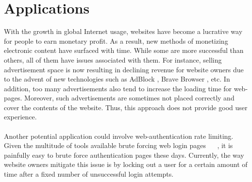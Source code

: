 \documentclass[runningheads]{llncs}
\begin{document}
\section{Applications}
With the growth in global Internet usage, websites have become a lucrative way for people to earn monetary profit. As a result, new methods of monetizing electronic content have surfaced with time. While some are more successful than others, all of them have issues associated with them. For instance, selling advertisement space is now resulting in declining revenue \cite{decliningRevenue} for website owners due to the advent of new technologies such as AdBlock \cite{Adblock}, Brave Browser \cite{BraveBrowser}, etc. In addition, too many advertisements also tend to increase the loading time for web-pages. Moreover, such advertisements are sometimes not placed correctly and cover the contents of the website. Thus, this approach does not provide good user experience. \\ \\
Another potential application could involve web-authentication rate limiting. Given the multitude of tools available brute forcing web login pages ~\cite{hydra} ~\cite{burpsuite}, it is painfully easy to brute force authentication pages these days. Currently, the way website owners mitigate this issue is by locking out a user for a certain amount of time after a fixed number of unsuccessful login attempts. 
\end{document}
